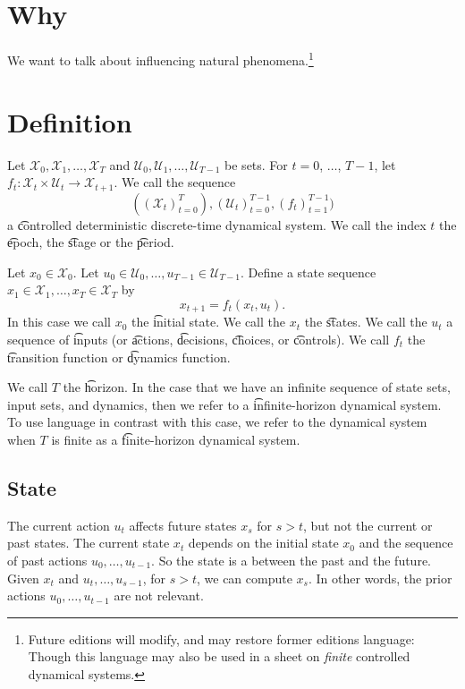 

\section*{Why}

We want to talk about influencing natural phenomena.\footnote{Future editions will modify, and may restore former editions language: 
Though this language may also be used in a sheet on \textit{finite} controlled dynamical systems.}

\section*{Definition}

Let $\mathcal{X} _0, \mathcal{X} _1, \dots , \mathcal{X} _{T}$ and $\mathcal{U} _0, \mathcal{U} _1, \dots , \mathcal{U} _{T-1}$ be sets.
For $t = 0$, $\dots $, $T-1$, let $f_{t}: \mathcal{X} _t \times \mathcal{U} _t \to \mathcal{X} _{t+1}$.
We call the sequence
    \[
((\mathcal{X} _t)_{t = 0}^{T}), (\mathcal{U} _t)_{t=0}^{T-1}, (f_t)_{t=1}^{T-1})
    \]
a \t{controlled deterministic discrete-time dynamical system}.
We call the index $t$ the \t{epoch}, the \t{stage} or the \t{period}.

Let $x_0 \in \mathcal{X} _0$.
Let $u_0 \in \mathcal{U} _0, \dots , u_{T-1} \in \mathcal{U} _{T-1}$. Define a state sequence $x_1 \in \mathcal{X} _1, \dots , x_T \in \mathcal{X} _T$ by
    \[
x_{t+1} = f_t(x_t, u_t).
    \]
In this case we call $x_0$ the \t{initial state}.
We call the $x_t$ the \t{states}.
We call the $u_t$ a sequence of \t{inputs} (or \t{actions}, \t{decisions}, \t{choices}, or \t{controls}).
We call $f_t$ the \t{transition function} or \t{dynamics function}.

We call $T$ the \t{horizon}.
In the case that we have an infinite sequence of state sets, input sets, and dynamics, then we refer to a \t{infinite-horizon} dynamical system.
To use language in contrast with this case, we refer to the dynamical system when $T$ is finite as a \t{finite-horizon} dynamical system.

\subsection*{State}

The current action $u_t$ affects future states $x_{s}$ for $s > t$, but not the current or past states.
The current state $x_t$ depends on the initial state $x_0$ and the sequence of past actions $u_0, \dots , u_{t-1}$.
So the state is a  between the past and the future.
Given $x_t$ and $u_t, \dots , u_{s-1}$, for $s > t$, we can compute $x_s$.
In other words, the prior actions $u_0, \dots , u_{t-1}$ are not relevant.

